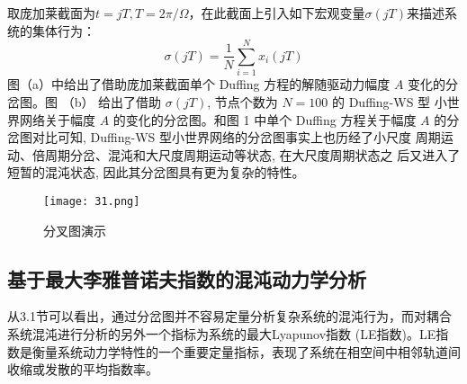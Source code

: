 取庞加莱截面为$t=j T, T=2 \pi / \Omega$，在此截面上引入如下宏观变量$\sigma(j T)$来描述系统的集体行为：
\begin{equation}
    \sigma(j T)=\frac{1}{N} \sum_{i=1}^N x_i(j T)
\end{equation}
图（a）中给出了借助庞加莱截面单个 Duffing 方程的解随驱动力幅度 $A$ 变化的分岔图。图 （b） 给出了借助 $\sigma(j T)$, 
节点个数为 $N=100$ 的 Duffing-WS 型 小世界网络关于幅度 $A$ 的变化的分岔图。和图 1 中单个 Duffing 方程关于幅度 $A$ 
的分岔图对比可知, Duffing-WS 型小世界网络的分岔图事实上也历经了小尺度 周期运动、倍周期分岔、混沌和大尺度周期运动等状态,
 在大尺度周期状态之 后又进入了短暂的混沌状态, 因此其分岔图具有更为复杂的特性。
 \begin{figure}[!htbp]
    \centering
    \texttt{[image: 31.png]}
    \caption{分叉图演示}
 \end{figure}
\subsection{基于最大李雅普诺夫指数的混沌动力学分析}
从3.1节可以看出，通过分岔图并不容易定量分析复杂系统的混沌行为，而对耦合系统混沌进行分析的另外一个指标为系统的最大Lyapunov指数
(LE指数)。LE指数是衡量系统动力学特性的一个重要定量指标，表现了系统在相空间中相邻轨道间收缩或发散的平均指数率。

